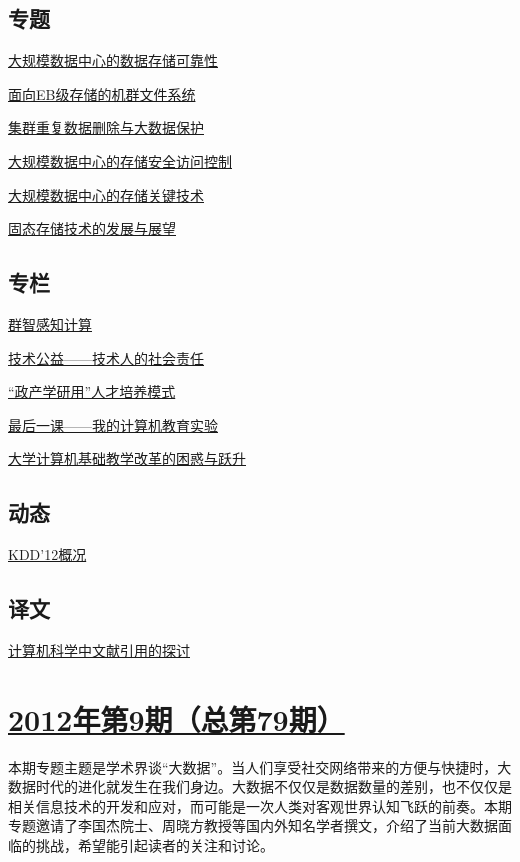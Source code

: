 \documentclass[a4paper]{article}
\begin{document}
\subsection{专题}
\href{http://history.ccf.org.cn/resources/1190201776262/2012/10/17/2.pdf}{大规模数据中心的数据存储可靠性}

\href{http://history.ccf.org.cn/resources/1190201776262/2012/10/17/5.pdf}{面向EB级存储的机群文件系统}

\href{http://history.ccf.org.cn/resources/1190201776262/2012/10/17/4.pdf}{集群重复数据删除与大数据保护}

\href{http://history.ccf.org.cn/resources/1190201776262/2012/10/17/6.pdf}{大规模数据中心的存储安全访问控制}

\href{http://history.ccf.org.cn/resources/1190201776262/2012/10/17/1.pdf}{大规模数据中心的存储关键技术}

\href{http://history.ccf.org.cn/resources/1190201776262/2012/10/17/3.pdf}{固态存储技术的发展与展望}

\subsection{专栏}
\href{http://history.ccf.org.cn/resources/1190201776262/2012/10/17/7.pdf}{群智感知计算}

\href{http://history.ccf.org.cn/resources/1190201776262/2012/10/17/8.pdf}{技术公益——技术人的社会责任}

\href{http://history.ccf.org.cn/resources/1190201776262/2012/10/17/11.pdf}{“政产学研用”人才培养模式}

\href{http://history.ccf.org.cn/resources/1190201776262/2012/10/17/10.pdf}{最后一课——我的计算机教育实验}

\href{http://history.ccf.org.cn/resources/1190201776262/2012/10/17/9.pdf}{大学计算机基础教学改革的困惑与跃升}

\subsection{动态}
\href{http://history.ccf.org.cn/resources/1190201776262/2012/10/17/12.pdf}{KDD’12概况}

\subsection{译文}
\href{http://history.ccf.org.cn/resources/1190201776262/2012/10/17/13.pdf}{计算机科学中文献引用的探讨}


\section{\href{http://history.ccf.org.cn/sites/ccf/jsjtbbd.jsp?contentId=2694962949020}{\textbf{2012年第9期（总第79期）}}}
本期专题主题是学术界谈“大数据”。当人们享受社交网络带来的方便与快捷时，大数据时代的进化就发生在我们身边。大数据不仅仅是数据数量的差别，也不仅仅是相关信息技术的开发和应对，而可能是一次人类对客观世界认知飞跃的前奏。本期专题邀请了李国杰院士、周晓方教授等国内外知名学者撰文，介绍了当前大数据面临的挑战，希望能引起读者的关注和讨论。
\end{document}
